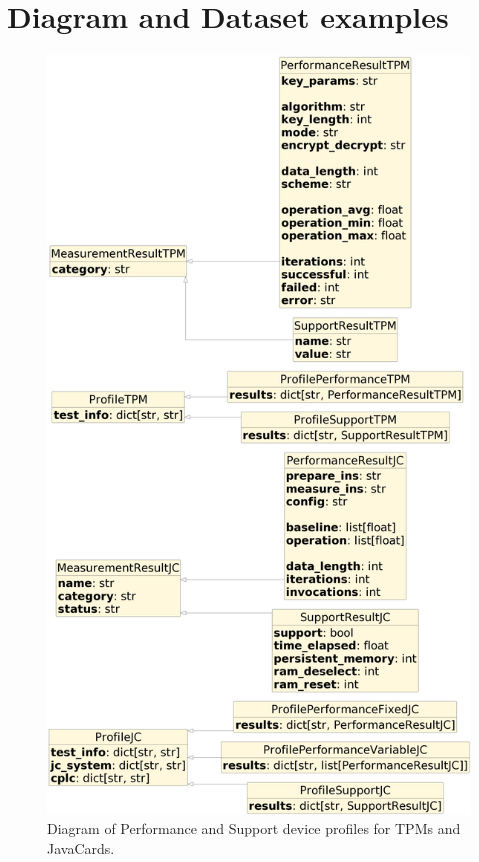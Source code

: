 \chapter{Diagram and Dataset examples}\label{appendix:diagram-profiles}
\begin{figure}[H]
    \centering
    \includegraphics[width=\textwidth,height=\textheight-6cm, keepaspectratio]{img/diagrams/object_diagram.png}
    \caption{Diagram of Performance and Support device profiles for TPMs and JavaCards.}
    \label{fig:dev-profiles-diagram}
\end{figure}


